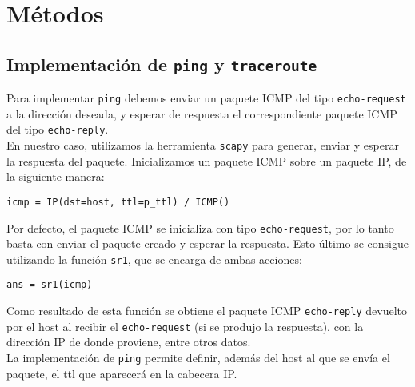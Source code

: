 \section{M\'etodos}
 
 \subsection{Implementaci\'on de \texttt{ping} y \texttt{traceroute}}
 
 Para implementar \texttt{ping} debemos enviar un paquete ICMP del tipo \texttt{echo-request} a la direcci\'on deseada, y esperar de respuesta el correspondiente paquete ICMP del tipo \texttt{echo-reply}.\\
 
 En nuestro caso, utilizamos la herramienta \texttt{scapy} para generar, enviar y esperar la respuesta del paquete. Inicializamos un paquete ICMP sobre un paquete IP, de la siguiente manera:\\
 
 \begin{center}
    \texttt{icmp = IP(dst=host, ttl=p\_ttl) / ICMP()}
 \end{center}
 
 Por defecto, el paquete ICMP se inicializa con tipo \texttt{echo-request}, por lo tanto basta con enviar el paquete creado y esperar la respuesta. Esto \'ultimo se consigue utilizando la funci\'on \texttt{sr1}, que se encarga de ambas acciones:
 
 \begin{center}
    \texttt{ans = sr1(icmp)}
 \end{center}
 
 Como resultado de esta funci\'on  se obtiene el paquete ICMP  \texttt{echo-reply} devuelto por el host al recibir el \texttt{echo-request} (si se produjo la respuesta), con la direcci\'on IP de donde proviene, entre otros datos.\\
 
 La implementaci\'on de \texttt{ping} permite definir, adem\'as del host al que se env\'ia el paquete, el ttl que aparecer\'a en la cabecera IP.\\
  
 
